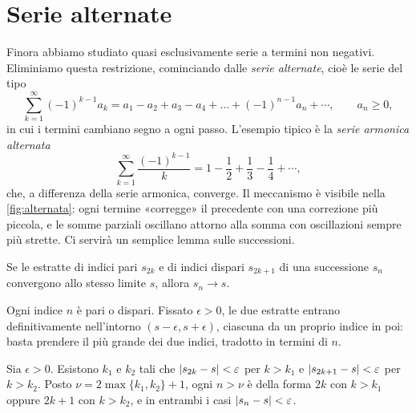 \section{Serie alternate}
\label{sec:serie-alternate}

Finora abbiamo studiato quasi esclusivamente serie a termini non negativi. Eliminiamo
questa restrizione, cominciando dalle \emph{serie alternate},
cioè le serie del tipo
\begin{equation}\label{eq:serie-alternata}
  \sum_{k=1}^{\infty}(-1)^{k-1}a_{k}=a_{1}-a_{2}+a_{3}-a_{4}+\dots+(-1)^{n-1}a_{n}+\cdots, \qquad a_{n}\ge0 ,
\end{equation}
in cui i termini cambiano segno a ogni passo. L'esempio tipico è la \emph{serie armonica
alternata}
\begin{equation}\label{eq:armonica-alternata}
  \sum_{k=1}^{\infty}\frac{(-1)^{k-1}}k=1-\frac12+\frac13-\frac14+\cdots ,
\end{equation}
che, a differenza della serie armonica, converge. Il meccanismo è visibile nella
\cref{fig:alternata}: ogni termine «corregge» il precedente con una correzione più
piccola, e le somme parziali oscillano attorno alla somma con oscillazioni sempre più
strette. Ci servirà un semplice lemma sulle successioni.

\begin{lemma}\label{lem:pari-dispari}
Se le estratte di indici pari $s_{2k}$ e di indici dispari $s_{2k+1}$ di una successione
$s_{n}$ convergono allo stesso limite $s$, allora $s_{n}\to s$.
\end{lemma}

\begin{schema}
\end{schema}

\begin{strategia}
Ogni indice $n$ è pari o dispari. Fissato $\epsilon>0$, le due estratte entrano
definitivamente nell'intorno $(s-\epsilon,s+\epsilon)$, ciascuna da un proprio indice in poi: basta
prendere il più grande dei due indici, tradotto in termini di $n$.
\end{strategia}

\begin{dimostrazione}
Sia $\epsilon>0$. Esistono $k_{1}$ e $k_{2}$ tali che $\lvert s_{2k}-s\rvert<\varepsilon$ per $k>k_{1}$ e
$\lvert s_{2k+1}-s\rvert<\varepsilon$ per $k>k_{2}$. Posto $\nu=2\max\{k_{1},k_{2}\}+1$, ogni $n>\nu$ è della forma
$2k$ con $k>k_{1}$ oppure $2k+1$ con $k>k_{2}$, e in entrambi i casi $\lvert s_{n}-s\rvert<\varepsilon$.
\end{dimostrazione}

